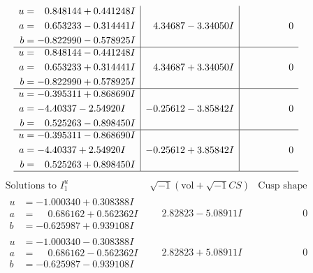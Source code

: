 \documentclass[1p]{elsarticle_modified}
\theoremstyle{definition}
\newcommand{\I}{\sqrt{-1}}
\begin{document}
$$\begin{array}{c|c|c}
\begin{aligned}
u &= \phantom{-}0.848144 + 0.441248 I \\
a &= \phantom{-}0.653233 - 0.314441 I \\
b &= -0.822990 - 0.578925 I\end{aligned}
 & \phantom{-}4.34687 - 3.34050 I & \phantom{-0.000000 } 0 \\ \hline\begin{aligned}
u &= \phantom{-}0.848144 - 0.441248 I \\
a &= \phantom{-}0.653233 + 0.314441 I \\
b &= -0.822990 + 0.578925 I\end{aligned}
 & \phantom{-}4.34687 + 3.34050 I & \phantom{-0.000000 } 0 \\ \hline\begin{aligned}
u &= -0.395311 + 0.868690 I \\
a &= -4.40337 - 2.54920 I \\
b &= \phantom{-}0.525263 - 0.898450 I\end{aligned}
 & -0.25612 - 3.85842 I & \phantom{-0.000000 } 0 \\ \hline\begin{aligned}
u &= -0.395311 - 0.868690 I \\
a &= -4.40337 + 2.54920 I \\
b &= \phantom{-}0.525263 + 0.898450 I\end{aligned}
 & -0.25612 + 3.85842 I & \phantom{-0.000000 } 0\\
 \hline 
 \end{array}$$\newpage$$\begin{array}{c|c|c}  
\text{Solutions to }I^u_{1}& \I (\text{vol} + \sqrt{-1}CS) & \text{Cusp shape}\\
 \hline 
\begin{aligned}
u &= -1.000340 + 0.308388 I \\
a &= \phantom{-}0.686162 + 0.562362 I \\
b &= -0.625987 + 0.939108 I\end{aligned}
 & \phantom{-}2.82823 - 5.08911 I & \phantom{-0.000000 } 0 \\ \hline\begin{aligned}
u &= -1.000340 - 0.308388 I \\
a &= \phantom{-}0.686162 - 0.562362 I \\
b &= -0.625987 - 0.939108 I\end{aligned}
 & \phantom{-}2.82823 + 5.08911 I & \phantom{-0.000000 } 0 \\ \hline\begin{aligned}

\end{aligned}
\end{array}$$
\end{document}
